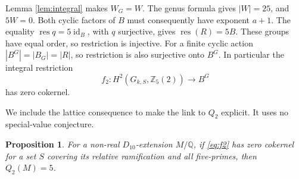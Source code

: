\documentclass[11pt]{article}
\newtheorem{proposition}[theorem]{Proposition}
\theoremstyle{remark}\newtheorem{remark}[theorem]{Remark}
\newcommand{\Q}{\mathbb Q}\newcommand{\Z}{\mathbb Z}
\newcommand{\res}{\operatorname{res}}\newcommand{\cor}{\operatorname{cor}}
\begin{document}
Lemma \ref{lem:integral} makes \(W_G=W\). The genus formula gives \(|W|=25\),
and \(5W=0\). Both cyclic factors of \(B\) must consequently have exponent
\(a+1\). The equality \(\res q=5\operatorname{id}_B\), with \(q\) surjective,
gives \(\res(R)=5B\). These groups have equal order, so restriction is
injective. For a finite cyclic action \(|B^G|=|B_G|=|R|\), so restriction is
also surjective onto \(B^G\). In particular the integral restriction
\begin{equation}\label{eq:f2}
 f_2:H^2(G_{k,S},\Z_5(2))\longrightarrow B^G
\end{equation}
has zero cokernel.

We include the lattice consequence to make the link to \(Q_2\) explicit.
It uses no special-value conjecture.
\begin{proposition}\label{prop:lattice}
For a non-real \(D_{10}\)-extension \(M/\Q\), if \eqref{eq:f2} has zero
cokernel for a set \(S\) covering its relative ramification and all five-primes,
then \(Q_2(M)=5\).
\end{proposition}
\end{document}
